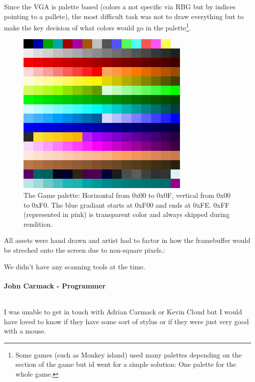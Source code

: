 \documentclass[book.tex]{subfiles}
\begin{document}
Since the VGA is palette based (colors a not specific via RBG but by indices pointing to a pallete), the most difficult task was not to draw everything but to make the key decision of what colors would go in the palette\footnote{Some games (such as Monkey island) used many palettes depending on the section of the game but id went for a simple solution: One palette for the whole game.}.\\
\begin{figure}[H]
  \centering
 \includegraphics[width=\textwidth]{imgs/palette.png}
 \caption{The Game palette: Horizontal from 0x00 to 0x0F, vertical from 0x00 to 0xF0. The blue gradiant starts at 0xF00 and ends at 0xFE. 0xFF (represented in pink) is transparent color and always skipped during rendition.}
\end{figure}

All assets were hand drawn and artist had to factor in how the framebuffer would be streched onto the screen due to non-square pixels.:\\
\begin{fancyquotes}
We didn't have any scanning tools at the time.\\
\\
\textbf{John Carmack - Programmer}
\end{fancyquotes}
\\
I was unable to get in touch with Adrian Carmack or Kevin Cloud but I would have loved to know if they have some sort of stylus or if they were just very good with a mouse.\\
\end{document}
